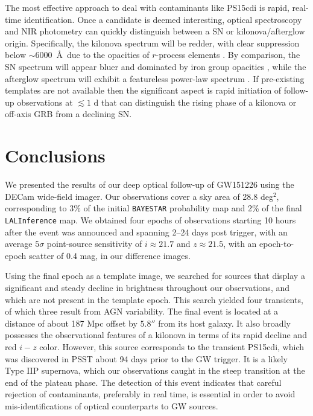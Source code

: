 \clearpage
The most effective approach to deal with contaminants like PS15cdi is rapid,
real-time identification. Once a candidate is deemed interesting, optical spectroscopy and 
NIR photometry can quickly distinguish between a SN or kilonova/afterglow
origin. Specifically, the kilonova spectrum will be redder, with clear suppression below $\sim 6000$~\AA~due
to the opacities of $r$-process elements \citep{Kasen+13}. By comparison, the SN spectrum will appear bluer and
dominated by iron group opacities \citep{Kasen+13}, while the afterglow spectrum will exhibit a featureless power-law
spectrum \citep{Berger2014}. If pre-existing templates are not available then the significant aspect is rapid initiation of
follow-up observations at $\lesssim 1$ d that can distinguish the rising phase of a kilonova or 
off-axis GRB from a declining SN.

\section{Conclusions}
\label{sec:ch4_conc}
We presented the results of our deep optical follow-up of 
GW151226 using the DECam wide-field
imager. Our observations cover a sky area of 28.8 deg$^2$,
corresponding to $3\%$ of the initial {\tt BAYESTAR} probability map
and 2\% of the final {\tt LALInference} map. We obtained
four epochs of observations starting 10 hours after the 
event was announced and spanning 2--24 days post
trigger, with an average $5\sigma$ point-source sensitivity of 
$i\approx21.7$ and $z\approx21.5$, with an epoch-to-epoch scatter
of 0.4 mag, in our difference images.

Using the final epoch as a template image, we searched for sources
that display a significant and steady decline in brightness
throughout our observations, and which are not present in the template
epoch. This search yielded four transients, of which three result from
AGN variability. The final event is located at a distance of about
187 Mpc offset by $5.8''$ from its host galaxy. It also broadly possesses the
observational features of a kilonova in terms of its rapid decline and
red $i-z$ color. However, this source corresponds to the transient
PS15cdi, which was discovered in PSST about 94 days prior to the GW
trigger. It is a likely Type IIP supernova, which our observations
caught in the steep transition at the end of the plateau phase. The
detection of this event indicates that careful rejection of
contaminants, preferably in real time, is essential in order to avoid
mis-identifications of optical counterparts to GW sources.